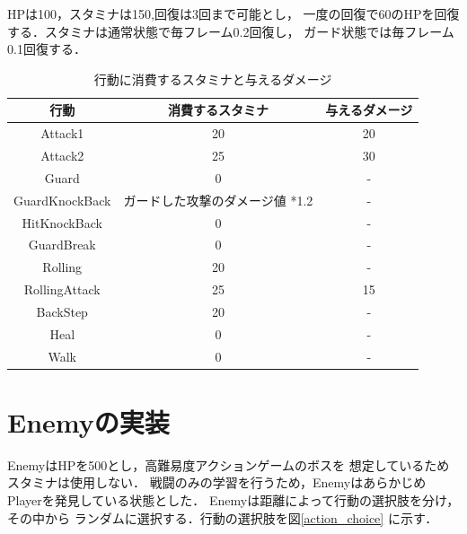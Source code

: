 \documentclass[a4paper,12pt,oneside,openany,titlepage]{jreport}
\begin{document}
HPは100，スタミナは150,回復は3回まで可能とし，
一度の回復で60のHPを回復する．スタミナは通常状態で毎フレーム0.2回復し，
ガード状態では毎フレーム0.1回復する．

 \begin{table}[!ht]
  \centering
  \caption{行動に消費するスタミナと与えるダメージ}
  \label{Action_Stamina_Damage}
  \begin{tabular}{c|c|c}    
  \hline
      行動 & 消費するスタミナ & 与えるダメージ \\ \hline
      Attack1 & 20 & 20 \\ \hline
      Attack2 & 25 & 30 \\ \hline
      Guard & 0 & - \\ \hline
      GuardKnockBack & ガードした攻撃のダメージ値 *1.2 & - \\ \hline
      HitKnockBack & 0 & - \\ \hline
      GuardBreak & 0& - \\ \hline
      Rolling & 20 & - \\ \hline
      RollingAttack & 25 & 15 \\ \hline
      BackStep& 20 & - \\ \hline
      Heal & 0 & - \\ \hline
      Walk& 0 & - \\ \hline
  \end{tabular}
\end{table}


 
 \newpage
 
 \section{Enemyの実装}
 EnemyはHPを500とし，高難易度アクションゲームのボスを
 想定しているためスタミナは使用しない．
 戦闘のみの学習を行うため，Enemyはあらかじめ
 Playerを発見している状態とした．
 Enemyは距離によって行動の選択肢を分け，その中から
 ランダムに選択する．行動の選択肢を図\ref{action_choice}
 に示す．
 
\end{document}
